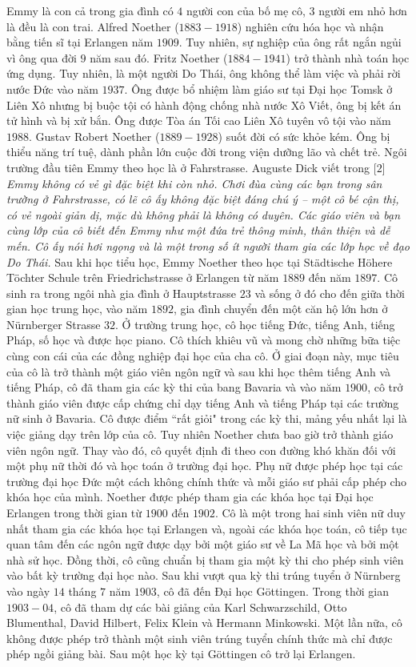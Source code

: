 \begin{multicols}{2}
	\vskip 0.05cm
	Emmy là con cả trong gia đình có $4$ người con của bố mẹ cô, $3$ người em nhỏ hơn là đều là con trai. Alfred Noether ($1883-1918$) nghiên cứu hóa học và nhận bằng tiến sĩ tại Erlangen năm $1909$. Tuy nhiên, sự nghiệp của ông rất ngắn ngủi vì ông qua đời $9$ năm sau đó. Fritz Noether ($1884-1941$) trở thành nhà toán học ứng dụng. Tuy nhiên, là một người Do Thái, ông không thể làm việc và phải rời nước Đức vào năm $1937$. Ông được bổ nhiệm làm giáo sư tại Đại học Tomsk ở Liên Xô nhưng bị buộc tội có hành động chống nhà nước  Xô Viết, ông bị kết án tử hình và bị xử bắn. Ông được Tòa án Tối cao Liên Xô tuyên vô tội vào năm $1988$. Gustav Robert Noether ($1889-1928$) suốt đời có sức khỏe kém. Ông bị thiểu năng trí tuệ, dành phần lớn cuộc đời trong viện dưỡng lão và chết trẻ. Ngôi trường đầu tiên Emmy theo học là ở Fahrstrasse. Auguste Dick viết trong [$2$]
	\vskip 0.05cm
	\textit{Emmy không có vẻ gì đặc biệt khi còn nhỏ. Chơi đùa cùng các bạn trong sân trường ở Fahrstrasse, có lẽ cô ấy không đặc biệt đáng chú ý -- một cô bé cận thị, có vẻ ngoài giản dị, mặc dù không phải là không có duyên. Các giáo viên và bạn cùng lớp của cô biết đến Emmy như một đứa trẻ thông minh, thân thiện và dễ mến. Cô ấy nói hơi ngọng và là một trong số ít người tham gia các lớp học về đạo Do Thái.}
	\vskip 0.05cm
	Sau khi học tiểu học, Emmy Noether theo học tại Städtische Höhere Töchter Schule trên Friedrichstrasse ở Erlangen từ năm $1889$ đến năm $1897$. Cô sinh ra trong ngôi nhà gia đình ở Hauptstrasse $23$ và sống ở đó cho đến giữa thời gian học trung học, vào năm $1892$, gia đình chuyển đến một căn hộ lớn hơn ở Nürnberger Strasse $32$. Ở trường trung học, cô học tiếng Đức, tiếng Anh, tiếng Pháp, số học và được học piano. Cô thích khiêu vũ và mong chờ những bữa tiệc cùng con cái của các đồng nghiệp đại học của cha cô. Ở giai đoạn này, mục tiêu của cô là trở thành một giáo viên ngôn ngữ và sau khi học thêm tiếng Anh và tiếng Pháp, cô đã tham gia các kỳ thi của bang Bavaria và vào năm $1900$, cô trở thành giáo viên được cấp chứng chỉ dạy tiếng Anh và tiếng Pháp tại các trường nữ sinh ở Bavaria. Cô được điểm ``rất giỏi" trong các kỳ thi, mảng yếu nhất lại là việc giảng dạy trên lớp của cô.
	\vskip 0.05cm
	Tuy nhiên Noether chưa bao giờ trở thành giáo viên ngôn ngữ. Thay vào đó, cô quyết định đi theo con đường khó khăn đối với một phụ nữ thời đó và học toán ở trường đại học. Phụ nữ được phép học tại các trường đại học Đức một cách không chính thức và mỗi giáo sư phải cấp phép cho khóa học của mình. Noether được phép tham gia các khóa học tại Đại học Erlangen trong thời gian từ $1900$ đến $1902$. Cô là một trong hai sinh viên nữ duy nhất tham gia các khóa học tại Erlangen và, ngoài các khóa học toán, cô tiếp tục quan tâm đến các ngôn ngữ được dạy bởi một giáo sư về La Mã học và bởi một nhà sử học. Đồng thời, cô cũng chuẩn bị tham gia một kỳ thi cho phép sinh viên vào bất kỳ trường đại học nào. Sau khi vượt qua kỳ thi trúng tuyển ở Nürnberg vào ngày $14$ tháng $7$ năm $1903$, cô đã đến Đại học Göttingen. Trong thời gian $1903-04$, cô đã tham dự các bài giảng của Karl Schwarzschild, Otto Blumenthal, David Hilbert, Felix Klein và Hermann Minkowski. Một lần nữa, cô không được phép trở thành một sinh viên trúng tuyển chính thức mà chỉ được phép ngồi giảng bài. Sau một học kỳ tại Göttingen cô trở lại Erlangen.

\end{multicols}
